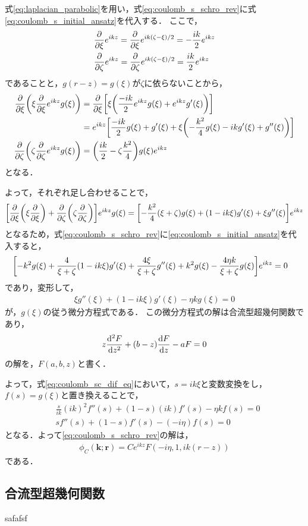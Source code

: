 \documentclass[a4paper,11pt]{ltjsarticle}
\begin{document}
式\ref{eq:laplacian_parabolic}を用い，式\ref{eq:coulomb_s_schro_rev}に式\ref{eq:coulomb_s_initial_ansatz}を代入する．
ここで，
\begin{align*}
  &\pdv{\xi} e^{ikz} = \pdv{\xi} e^{ik(\zeta-\xi)/2} = - \frac{ik}{2} e^{ikz}\\
  &\pdv{\zeta} e^{ikz} =   \pdv{\zeta} e^{ik(\zeta-\xi)/2} =  \frac{ik}{2} e^{ikz}
\end{align*}
であることと，$g(r-z) = g(\xi)$が$\zeta$に依らないことから，
\begin{align*}
  \pdv{\xi}\qty(\xi \pdv{\xi} e^{ikz}g(\xi)) 
  &= \pdv{\xi}\qty[\xi\qty(\frac{-ik}{2}e^{ikz}g(\xi) + e^{ikz}g'(\xi))] \\
  &=e^{ikz}\qty[\frac{-ik}{2} g(\xi) + g'(\xi) + \xi\qty(-\frac{k^2}{4} g(\xi) - ikg'(\xi) + g''(\xi))] \\
  \pdv{\zeta}\qty(\zeta \pdv{\zeta} e^{ikz} g(\xi)) &= \qty( \frac{ik}{2}  - \zeta \frac{k^2}{4})g(\xi)e^{ikz}
\end{align*}
となる．

よって，それぞれ足し合わせることで，
\begin{align*}
  \qty[\pdv{\xi}\qty(\xi\pdv{\xi}) + \pdv{\zeta}\qty(\zeta\pdv{\zeta})]e^{ikz} g(\xi)
  = \qty[ - \frac{k^2}{4}(\xi+\zeta)g(\xi) + \qty(1 - ik\xi )g'(\xi) + \xi g''(\xi)] e^{ikz}
\end{align*}
となるため，式\ref{eq:coulomb_s_schro_rev}に\ref{eq:coulomb_s_initial_ansatz}を代入すると，
\begin{align}\label{eq:scat_sol_dif_eq}
&\qty[-k^2 g(\xi) + \frac{4}{\xi + \zeta} \qty(1-ik\xi )g'(\xi) + \frac{4\xi}{\xi+ \zeta}g''(\xi) + k^2g(\xi) - \frac{4\eta k}{\xi + \zeta} g(\xi)] e^{ikz} = 0 
\end{align}
であり，変形して，
\begin{align}\label{eq:coulomb_sc_dif_eq}
  \xi g''(\xi) + (1 - ik\xi) g'(\xi) - \eta k g(\xi) = 0
\end{align}
が，$g(\xi)$の従う微分方程式である．
この微分方程式の解は合流型超幾何関数であり，
\begin{align}\label{eq:cofluent_hyp_geom_dif}
  z \dv[2]{F}{z} + (b - z) \dv{F}{z} - aF = 0
\end{align}
の解を，$F(a,b,z)$と書く．

よって，式\ref{eq:coulomb_sc_dif_eq}において，$s = ik\xi$と変数変換をし，$f(s) = g(\xi)$と置き換えることで，
\begin{align*}
  &\frac{s}{ik} (ik)^2 f''(s) + (1 - s) (ik) f'(s) - \eta k f(s) = 0 \\
  & s f''(s) + (1-s) f'(s) - (- i \eta) f(s)  = 0
\end{align*}
となる．よって\ref{eq:coulomb_s_schro_rev}の解は，
\begin{align}\label{eq:coulomb_sc_solution}
  \phi_C(\bm{k};\bm{r}) = C e^{ikz} F(-i\eta, 1, ik(r-z))
\end{align}
である．
\subsection{合流型超幾何関数}
safafsf

\newpage
% 
% 
\printbibliography%
\end{document}
